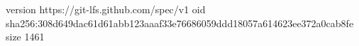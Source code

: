 version https://git-lfs.github.com/spec/v1
oid sha256:308d649dac61d61abb123aaaf33e76686059ddd18057a614623ee372a0cab8fe
size 1461
